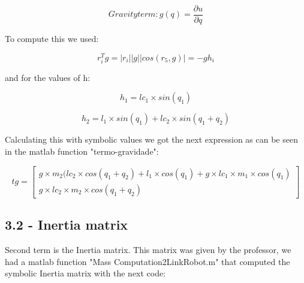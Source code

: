 \begin{equation}
    Gravityterm: g(q) = \frac{\partial u}{\partial q}
\end{equation}

To compute this we used: 

\begin{equation}
    r_i^Tg = |r_i||g||cos(r_5,g)| = -gh_i
\end{equation}

and for the values of h:

\begin{equation}
    h_1 = lc_1 \times sin(q_1)
\end{equation}

\begin{equation}
    h_2 = l_1 \times sin(q_1) + lc_2 \times sin(q_1 + q_2)
\end{equation}

Calculating this with symbolic values we got the next expression as can be seen in the matlab function "termo-gravidade":

\begin{equation}
    tg=\begin{bmatrix}
g \times m_2 (lc_2 \times cos(q_1 + q_2) + l_1 \times cos(q_1) + g \times lc_1 \times m_1 \times cos(q_1) \\
g \times lc_2 \times m_2 \times cos(q_1 + q_2) 
\end{bmatrix}
\end{equation}


\subsection{3.2 - Inertia matrix}

Second term is the Inertia matrix. This matrix was given by the professor, we had a matlab function "Mass Computation2LinkRobot.m" that computed the symbolic Inertia matrix with the next code:

